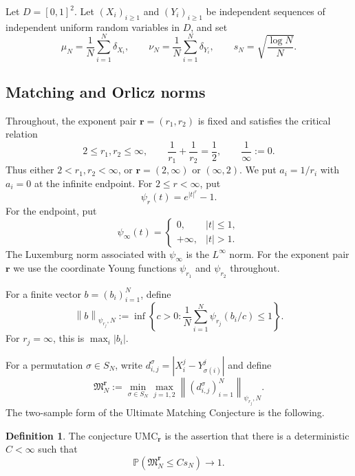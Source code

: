 \documentclass[11pt]{article}
\theoremstyle{definition}
\newtheorem{definition}[definition]{Definition}
\theoremstyle{remark}
\numberwithin{equation}{section}
\newcommand{\Pp}{\mathbb P}
\newcommand{\norm}[1]{\left\|#1\right\|}
\newcommand{\abs}[1]{\left|#1\right|}
\newcommand{\set}[1]{\left\{#1\right\}}
\newcommand{\pa}[1]{\left(#1\right)}
\begin{document}
Let $D=[0,1]^2$.  Let $(X_i)_{i\ge1}$ and $(Y_i)_{i\ge1}$ be independent
sequences of independent uniform random variables in $D$, and set
\[
 \mu_N=\frac1N\sum_{i=1}^N\delta_{X_i},
 \qquad
 \nu_N=\frac1N\sum_{i=1}^N\delta_{Y_i},
 \qquad
 s_N=\sqrt{\frac{\log N}{N}}.
\]

\subsection{Matching and Orlicz norms}

Throughout, the exponent pair $\boldsymbol r=(r_1,r_2)$ is fixed and
satisfies the critical relation
\begin{equation}
 2\le r_1,r_2\le\infty,\qquad
 \frac1{r_1}+\frac1{r_2}=\frac12,
 \qquad\frac1\infty:=0.
 \label{red:eq:critical-pair}
\end{equation}
Thus either $2<r_1,r_2<\infty$, or $\boldsymbol r=(2,\infty)$ or
$(\infty,2)$. We put $a_i=1/r_i$ with $a_i=0$ at the infinite endpoint.
For $2\le r<\infty$, put
\[
 \psi_r(t)=e^{|t|^r}-1.
\]
For the endpoint, put
\[
 \psi_\infty(t)=
 \begin{cases}
 0,&|t|\le1,\\
 +\infty,&|t|>1.
 \end{cases}
\]
The Luxemburg norm associated with $\psi_\infty$ is the $L^\infty$ norm.
For the exponent pair $\boldsymbol r$ we use the coordinate Young functions $\psi_{r_1}$ and $\psi_{r_2}$ throughout.

For a finite vector $b=(b_i)_{i=1}^N$, define
\[
 \norm b_{\psi_{r_j},N}
 :=\inf\set{c>0:\frac1N\sum_{i=1}^N\psi_{r_j}(b_i/c)\le1}.
\]
For $r_j=\infty$, this is $\max_i |b_i|$.

For a permutation $\sigma\in S_N$, write
$d_{i,j}^\sigma=\abs{X_i^j-Y_{\sigma(i)}^j}$ and define
\begin{equation}
 \mathfrak M_N^{\boldsymbol r}
 :=\min_{\sigma\in S_N}
 \max_{j=1,2}\norm{(d_{i,j}^\sigma)_{i=1}^N}_{\psi_{r_j},N}.
 \label{red:eq:atomic-aniso}
\end{equation}
The two-sample form of the Ultimate Matching Conjecture is the following.

\begin{definition}
\label{red:def:UMC}
The conjecture $\mathrm{UMC}_{\boldsymbol r}$ is the assertion that
there is a deterministic $C<\infty$ such that
\begin{equation}
 \Pp\pa{\mathfrak M_N^{\boldsymbol r}\le Cs_N}\longrightarrow1.
 \label{red:eq:UMC}
\end{equation}
\end{definition}
\end{document}
